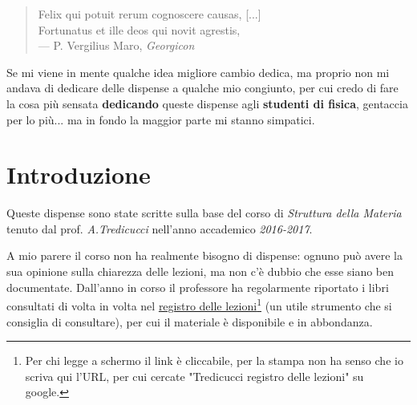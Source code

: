 \vspace*{3cm}

\begin{quote}
	Felix qui potuit rerum cognoscere causas, [...] \\
	Fortunatus et ille deos qui novit agrestis, \\ \medskip
	--- P. Vergilius Maro, \textit{Georgicon}
\end{quote}

\medskip

\begin{center}
	Se mi viene in mente qualche idea migliore cambio dedica, ma proprio non mi andava di dedicare delle dispense a qualche mio congiunto, per cui credo di fare la cosa più sensata \textbf{dedicando} queste dispense agli \textbf{studenti di fisica}, gentaccia per lo più... ma in fondo la maggior parte mi stanno simpatici.
\end{center}


\setcounter{tocdepth}{2}
\tableofcontents
\markboth{\scshape{\contentsname}}{\scshape{\contentsname}}


\makeatletter\@openrightfalse\makeatother


\chapter*{Introduzione}

Queste dispense sono state scritte sulla base del corso di \textit{Struttura della Materia} tenuto dal prof. \textit{A.Tredicucci} nell'anno accademico \textit{2016-2017}.
\newline

A mio parere il corso non ha realmente bisogno di dispense: ognuno può avere la sua opinione sulla chiarezza delle lezioni, ma non c'è dubbio che esse siano ben documentate. Dall'anno in corso il professore ha regolarmente riportato i libri consultati di volta in volta nel \href{http://unimap.unipi.it/registri/dettregistriNEW.php?re=181626::::&ri=12126}{registro delle lezioni}\footnote{Per chi legge a schermo il link è cliccabile, per la stampa non ha senso che io scriva qui l'URL, per cui cercate "Tredicucci registro delle lezioni" su google.} (un utile strumento che si consiglia di consultare), per cui il materiale è disponibile e in abbondanza.
\newline

